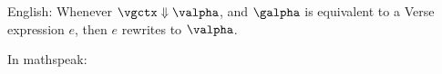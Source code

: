 \documentclass[]{article}
\begin{document}

English: Whenever $\vgctx \Downarrow \valpha$, and $\galpha$ is equivalent to 
a Verse expression $e$, then $e$ rewrites to $\valpha$. 

In mathspeak: 


\end{document}
